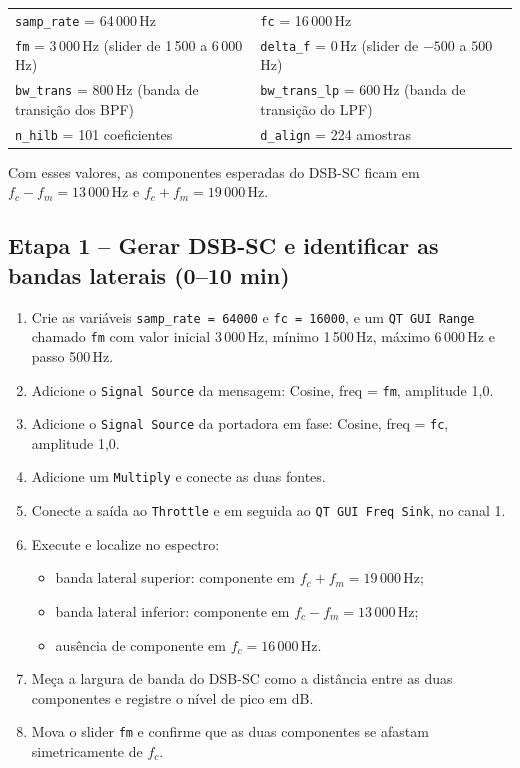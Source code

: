 \documentclass[11pt,a4paper]{article}
\begin{document}
\begin{center}
\begin{tabular}{l l}
  \toprule
  \texttt{samp\_rate} = 64\,000\,Hz    & \texttt{fc} = 16\,000\,Hz \\
  \texttt{fm} = 3\,000\,Hz (slider de 1\,500 a 6\,000\,Hz) & \texttt{delta\_f} = 0\,Hz (slider de $-500$ a $500$\,Hz) \\
  \texttt{bw\_trans} = 800\,Hz (banda de transição dos BPF) & \texttt{bw\_trans\_lp} = 600\,Hz (banda de transição do LPF) \\
  \texttt{n\_hilb} = 101 coeficientes  & \texttt{d\_align} = 224 amostras \\
  \bottomrule
\end{tabular}
\end{center}

Com esses valores, as componentes esperadas do DSB-SC ficam em
$f_c - f_m = 13\,000$\,Hz e $f_c + f_m = 19\,000$\,Hz.

\subsection*{Etapa 1 -- Gerar DSB-SC e identificar as bandas laterais (0--10 min)}

\begin{instrucao}
\begin{enumerate}[label=\arabic*.]
  \item Crie as variáveis \texttt{samp\_rate = 64000} e \texttt{fc = 16000},
    e um \texttt{QT GUI Range} chamado \texttt{fm} com valor inicial 3\,000\,Hz,
    mínimo 1\,500\,Hz, máximo 6\,000\,Hz e passo 500\,Hz.
  \item Adicione o \texttt{Signal Source} da mensagem: Cosine, freq = \texttt{fm},
    amplitude 1,0.
  \item Adicione o \texttt{Signal Source} da portadora em fase: Cosine,
    freq = \texttt{fc}, amplitude 1,0.
  \item Adicione um \texttt{Multiply} e conecte as duas fontes.
  \item Conecte a saída ao \texttt{Throttle} e em seguida ao
    \texttt{QT GUI Freq Sink}, no canal 1.
  \item Execute e localize no espectro:
    \begin{itemize}
      \item banda lateral superior: componente em $f_c + f_m = 19\,000$\,Hz;
      \item banda lateral inferior: componente em $f_c - f_m = 13\,000$\,Hz;
      \item ausência de componente em $f_c = 16\,000$\,Hz.
    \end{itemize}
  \item Meça a largura de banda do DSB-SC como a distância entre as duas
    componentes e registre o nível de pico em dB.
  \item Mova o slider \texttt{fm} e confirme que as duas componentes se afastam
    simetricamente de $f_c$.
\end{enumerate}
\end{instrucao}
\end{document}
